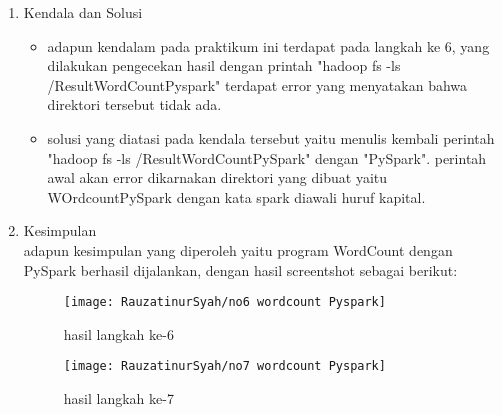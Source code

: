 \begin{enumerate}
\item Kendala dan Solusi
\begin{itemize}

\item adapun kendalam pada praktikum ini terdapat pada langkah ke 6, yang dilakukan pengecekan hasil dengan printah "hadoop fs -ls /ResultWordCountPyspark" terdapat error yang menyatakan bahwa direktori tersebut tidak ada.

\item solusi yang diatasi pada kendala tersebut yaitu menulis kembali perintah "hadoop fs -ls /ResultWordCountPySpark" dengan "PySpark". perintah awal akan error dikarnakan direktori yang dibuat yaitu WOrdcountPySpark dengan kata spark diawali huruf kapital.
\end{itemize}

\item Kesimpulan\\
adapun kesimpulan yang diperoleh yaitu program WordCount dengan PySpark berhasil dijalankan, dengan hasil screentshot sebagai berikut:

\begin{figure}[!ht]
\texttt{[image: RauzatinurSyah/no6 wordcount Pyspark]}
\caption{hasil langkah ke-6 }
\label{gam:hasil program WordCountPySpark}
\end{figure}

\begin{figure}[!ht]
\texttt{[image: RauzatinurSyah/no7 wordcount Pyspark]}
\caption{hasil langkah ke-7 }
\label{gam:hasil program WordCountPySpark}
\end{figure}
\end{enumerate}


